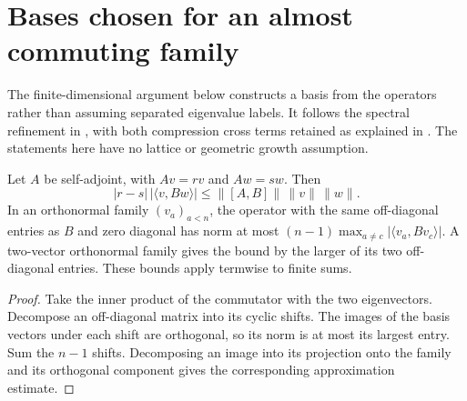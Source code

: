 \section{Bases chosen for an almost commuting family}

The finite-dimensional argument below constructs a basis from the operators
rather than assuming separated eigenvalue labels. It follows the spectral
refinement in \cite{Hastings2006Solving}, with both compression cross terms
retained as explained in \cite{gap:hastings05_basis_refinement}.
The statements here have no lattice or geometric growth assumption.

\begin{lemma}
    \label{lem:qic_approx_diagonalization_entries}
    \leanok

    \leanok

    \leanok

    Let $A$ be self-adjoint, with $Av=rv$ and $Aw=sw$. Then
    \[
      |r-s|\,|\langle v,Bw\rangle|
      \le \|[A,B]\|\,\|v\|\,\|w\|.
    \]
    In an orthonormal family $(v_a)_{a<n}$, the operator with the same
    off-diagonal entries as $B$ and zero diagonal has norm at most
    $(n-1)\max_{a\ne c}|\langle v_a,Bv_c\rangle|$.
    A two-vector orthonormal family gives the bound by the larger of its
    two off-diagonal entries. These bounds apply termwise to finite sums.
\end{lemma}
\begin{proof}\leanok
    Take the inner product of the commutator with the two eigenvectors.
    Decompose an off-diagonal matrix into its cyclic shifts. The images of
    the basis vectors under each shift are orthogonal, so its norm is at
    most its largest entry. Sum the $n-1$ shifts. Decomposing an image into
    its projection onto the family and its orthogonal component gives the
    corresponding approximation estimate.
\end{proof}

